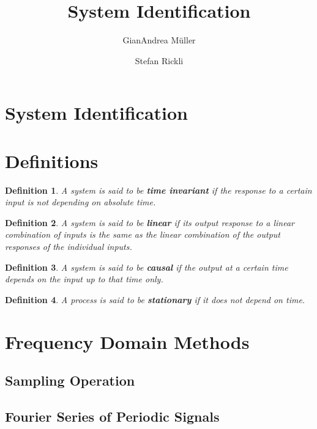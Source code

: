 \documentclass[10pt,a4paper]{scrartcl}
\title{System Identification}
\author{
GianAndrea Müller\\
\and
Stefan Rickli
}
\newtheorem{define}{Definition}
\begin{document}
\begin{multicols*}{4}
\maketitle
\tableofcontents
\end{multicols*}

\begin{multicols*}{2}
\section{System Identification}
\section{Definitions}

\begin{define}
A system is said to be \textbf{time invariant} if the response to a certain input is not depending on absolute time.
\end{define}

\begin{define}
A system is said to be \textbf{linear} if its output response to a linear combination of inputs is the same as the linear combination of the output responses of the individual inputs.
\end{define}

\begin{define}
A system is said to be \textbf{causal} if the output at a certain time depends on the input up to that time only.
\end{define}

\begin{define}
A process is said to be \textbf{stationary} if it does not depend on time.
\end{define}

\section{Frequency Domain Methods}

\subsection{Sampling Operation}


\subsection{Fourier Series of Periodic Signals}


\end{multicols*}
\end{document}
